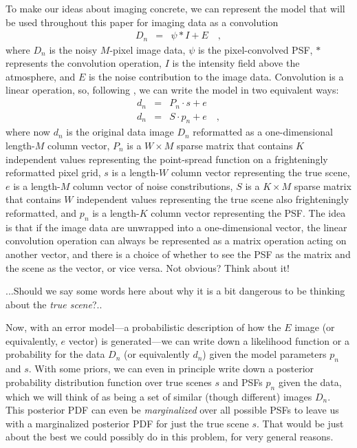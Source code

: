 \documentclass[12pt,preprint]{aastex}
\begin{document}
To make our ideas about imaging concrete, we can represent the model
that will be used throughout this paper for imaging data as a
convolution
\begin{eqnarray}\displaystyle
D_n &=& \psi \ast I + E
\quad ,
\end{eqnarray}
where $D_n$ is the noisy $M$-pixel image data, $\psi$ is the
pixel-convolved PSF, $\ast$ represents the convolution operation, $I$
is the intensity field above the atmosphere, and $E$ is the noise
contribution to the image data.  Convolution is a linear operation,
so, following \citet{hirsch}, we can write the model in two equivalent
ways:
\begin{eqnarray}\displaystyle
d_n &=& P_n \cdot s + e
\\
d_n &=& S \cdot p_n + e
\quad ,
\end{eqnarray}
where now $d_n$ is the original data image $D_n$ reformatted as a
one-dimensional length-$M$ column vector, $P_n$ is a $W\times M$
sparse matrix that contains $K$ independent values representing the
point-spread function on a frighteningly reformatted pixel grid, $s$
is a length-$W$ column vector representing the true scene, $e$ is a
length-$M$ column vector of noise constributions, $S$ is a $K\times M$
sparse matrix that contains $W$ independent values representing the
true scene also frighteningly reformatted, and $p_n$ is a length-$K$
column vector representing the PSF.  The idea is that if the image
data are unwrapped into a one-dimensional vector, the linear
convolution operation can always be represented as a matrix operation
acting on another vector, and there is a choice of whether to see the
PSF as the matrix and the scene as the vector, or vice versa.  Not
obvious?  Think about it!

...Should we say some words here about why it is a bit dangerous to be thinking about the \emph{true scene}?..

Now, with an error model---a probabilistic description of how the $E$
image (or equivalently, $e$ vector) is generated---we can write down a
likelihood function or a probability for the data $D_n$ (or
equivalently $d_n$) given the model parameters $p_n$ and $s$.  With
some priors, we can even in principle write down a posterior
probability distribution function over true scenes $s$ and PSFs $p_n$
given the data, which we will think of as being a set of similar
(though different) images $D_n$.  This posterior PDF can even be
\emph{marginalized} over all possible PSFs to leave us with a
marginalized posterior PDF for just the true scene $s$.  That would be
just about the best we could possibly do in this problem, for very
general reasons.
\end{document}
